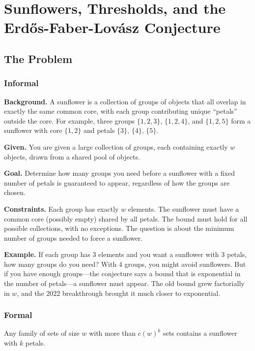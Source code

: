 \let\LocalMacro\relax

\chapter{Sunflowers, Thresholds, and the Erd\H{o}s-Faber-Lov\'{a}sz Conjecture}

\section{The Problem}

\subsection{Informal}

\textbf{Background.} A sunflower is a collection of groups of objects that all overlap in exactly the same common core, with each group contributing unique ``petals'' outside the core. For example, three groups $\{1,2,3\}$, $\{1,2,4\}$, and $\{1,2,5\}$ form a sunflower with core $\{1,2\}$ and petals $\{3\}$, $\{4\}$, $\{5\}$.

\textbf{Given.} You are given a large collection of groups, each containing exactly $w$ objects, drawn from a shared pool of objects.

\textbf{Goal.} Determine how many groups you need before a sunflower with a fixed number of petals is guaranteed to appear, regardless of how the groups are chosen.

\textbf{Constraints.} Each group has exactly $w$ elements. The sunflower must have a common core (possibly empty) shared by all petals. The bound must hold for all possible collections, with no exceptions. The question is about the minimum number of groups needed to force a sunflower.

\textbf{Example.} If each group has 3 elements and you want a sunflower with 3 petals, how many groups do you need? With 4 groups, you might avoid sunflowers. But if you have enough groups---the conjecture says a bound that is exponential in the number of petals---a sunflower must appear. The old bound grew factorially in $w$, and the 2022 breakthrough brought it much closer to exponential.

\subsection{Formal}
\begin{conjecture}
Any family of sets of size $w$ with more than $c(w)^k$ sets contains a sunflower with $k$ petals.
\end{conjecture}


